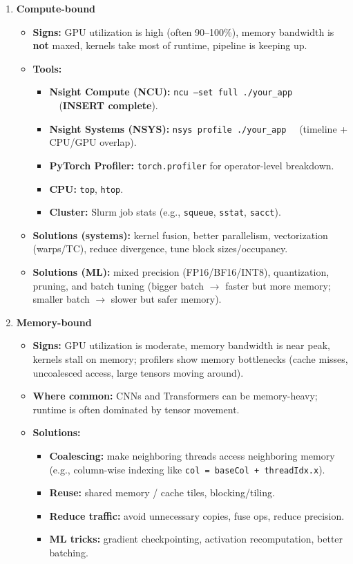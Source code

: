 \documentclass[11pt]{article}
\newcommand{\blue}[1]{\textcolor{myblue}{#1}}
\newcommand{\term}[1]{\textbf{\blue{#1}}}
\begin{document}
\begin{itemize}[leftmargin=1.2em]
    \begin{enumerate}[leftmargin=1.2em]
    \item \blue{\textbf{Compute-bound}}
    \begin{itemize}
    \item \textbf{Signs:} GPU utilization is high (often 90--100\%), memory bandwidth is \textbf{not} maxed, kernels take most of runtime, pipeline is keeping up.
    \item \textbf{Tools:}
    \begin{itemize}
    \item \term{Nsight Compute (NCU):} \texttt{ncu --set full ./your\_app} \ \ (\textbf{INSERT complete}).
    \item \term{Nsight Systems (NSYS):} \texttt{nsys profile ./your\_app} \ \ (timeline + CPU/GPU overlap).
    \item \term{PyTorch Profiler:} \texttt{torch.profiler} for operator-level breakdown.
    \item \term{CPU:} \texttt{top}, \texttt{htop}.
    \item \term{Cluster:} Slurm job stats (e.g., \texttt{squeue}, \texttt{sstat}, \texttt{sacct}).
    \end{itemize}
    
    \item \textbf{Solutions (systems):} kernel fusion, better parallelism, vectorization (warps/TC), reduce divergence, tune block sizes/occupancy.
    \item \textbf{Solutions (ML):} mixed precision (FP16/BF16/INT8), quantization, pruning, and batch tuning (bigger batch $\rightarrow$ faster but more memory; smaller batch $\rightarrow$ slower but safer memory).
    \end{itemize}
    
    \item \blue{\textbf{Memory-bound}}
    \begin{itemize}
    \item \textbf{Signs:} GPU utilization is moderate, memory bandwidth is near peak, kernels stall on memory; profilers show memory bottlenecks (cache misses, uncoalesced access, large tensors moving around).
    \item \textbf{Where common:} CNNs and Transformers can be memory-heavy; runtime is often dominated by tensor movement.
    \item \textbf{Solutions:}
    \begin{itemize}
    \item \term{Coalescing:} make neighboring threads access neighboring memory (e.g., column-wise indexing like \texttt{col = baseCol + threadIdx.x}).
    \item \term{Reuse:} shared memory / cache tiles, blocking/tiling.
    \item \term{Reduce traffic:} avoid unnecessary copies, fuse ops, reduce precision.
    \item \term{ML tricks:} gradient checkpointing, activation recomputation, better batching.
    \end{itemize}
    \end{itemize}
    

\end{enumerate}
\end{itemize}
\end{document}
